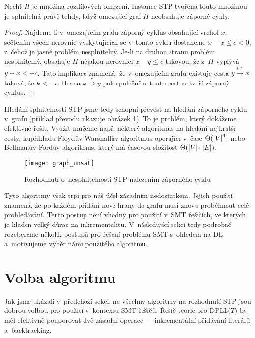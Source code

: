 \begin{tvrz}
	Nechť $\Pi$ je množina rozdílových omezení. Instance STP tvořená touto množinou je splnitelná právě tehdy, když omezující graf $\Pi$ neobsahuje záporné cykly.
\end{tvrz}
\begin{proof}
	Najdeme-li v~omezujícím grafu záporný cyklus obsahující vrchol $x$, sečtením všech nerovnic vyskytujících se v~tomto cyklu dostaneme $x-x \leq c < 0$, z~čehož je jasně problém nesplnitelný. Je-li na druhou stranu problém nesplnitelný, obsahuje $\Pi$ nějakou nerovnici $x - y \leq c$ takovou, že z~$\Pi$ vyplývá $y - x < -c$. Tato implikace znamená, že v~omezujícím grafu existuje cesta $y \xrightarrow{k*} x$ taková, že $k < -c$. Hrana $x \xrightarrow{c} y$ pak společně s~touto cestou tvoří záporný cyklus.
\end{proof}

Hledání splnitelnosti STP jsme tedy schopni převést na hledání záporného cyklu v~grafu (příklad převodu ukazuje obrázek \ref{fig:unsat}). To je problém, který dokážeme efektivně řešit. Využít můžeme např. některý algoritmus na hledání nejkratší cesty, kupříkladu Floydův-Warshallův algoritmus operující v~čase $\Theta(\left|{V}\right|^3)$ nebo Bellmanův-Fordův algoritmus, který má časovou složitost $\Theta(\left|{V}\right|\cdot\left|{E}\right|)$.

\begin{figure}
	\centering
	\texttt{[image: graph\_unsat]}
	\caption{Rozhodnutí o~nesplnitelnosti STP nalezením záporného cyklu}
	\label{fig:unsat}
\end{figure}

Tyto algoritmy však trpí pro náš účel zásadním nedostatkem. Jejich použití znamená, že po každém přidání nové hrany do grafu musí znovu proběhnout celé prohledávání. Tento postup není vhodný pro použití v~SMT řešičích, ve kterých je kladen velký důraz na inkrementalitu. V~následující sekci tedy podrobně rozebereme několik postupů pro řešení problémů SMT s~ohledem na DL a~motivujeme výběr námi použitého algoritmu. 

\section{Volba algoritmu}\label{alg}

Jak jsme ukázali v~předchozí sekci, ne všechny algoritmy na rozhodnutí STP jsou dobrou volbou pro použití v~kontextu SMT řešičů. Řešič teorie pro DPLL($T$) by měl efektivně podporovat dvě zásadní operace --- inkrementální přidávání literálů a~backtracking.

